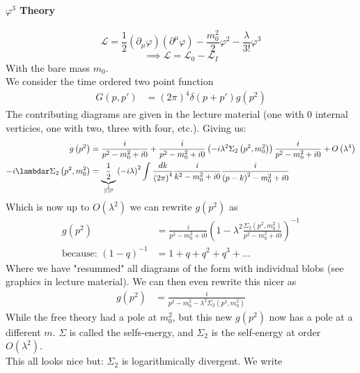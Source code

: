 \documentclass{report}
\begin{document}
\paragraph{$\varphi^3$ Theory} \[
\mathcal{L} = \frac{1}{2} \left( \partial_\mu \varphi  \right) \left( \partial^{\mu} \varphi  \right) - \frac{m_0^2}{2} \varphi^2 - \frac{\lambda}{3!} \varphi^3
\] \[
\implies \mathcal{L} = \mathcal{L}_0 - \mathcal{L}_I
\] With the bare mass $m_0$.\\
We consider the time ordered two point function
\begin{align*}
  G\left( p,p' \right) &= \left( 2\pi \right)^{4} \delta\left( p + p' \right) g\left( p^2 \right) 
\end{align*}
The contributing diagrams are given in the lecture material (one with 0 internal verticies, one with two, three with four, etc.). Giving us:
\begin{align*}
  g\left( p^2 \right) &= \frac{i}{p^2 - m_0^2 + i 0} + \frac{i}{p^2 - m_0^2 + i 0} \left( -i \lambda^2 \Sigma_2\left( p^2, m_0^2 \right)  \right) \frac{i}{p^2 - m_0^2 + i 0} + O\left( \lambda^{4}  \right)  \\
  -i \lambdar \Sigma_2\left( p^2, m_0^2 \right) &= \underbrace{\frac{1}{2} }_{\frac{1}{S S'} }  \left( -i \lambda \right)^2 \int_{}^{} \frac{dk}{\left( 2\pi \right) ^{4} } \frac{i}{k^2 - m_0^2 + i 0} \frac{i}{\left( p-k \right) ^2 - m_0^2 + i 0}   
\end{align*}
Which is now up to $O\left( \lambda^2 \right) $ we can rewrite $g\left( p^2 \right) $ as
\begin{align*}
  g\left( p^2 \right) &= \frac{i}{p^2 - m_0^2 + i 0} \left( 1 - \lambda^2 \frac{\Sigma_2\left( p^2, m_0^2 \right) }{p^2 - m_0^2 + i 0}  \right) ^{-1}  \\
  \text{because:  } \left( 1-q \right) ^{-1} &= 1 + q + q^2 + q^3 + \ldots 
\end{align*}
Where we have "resummed" all diagrams of the form with individual blobs (see graphics in lecture material). We can then even rewrite this nicer as
\begin{align*}
  g\left( p^2 \right) &= \frac{i}{p^2 - m_0^2 - \lambda^2 \Sigma_2\left( p^2, m_0^2 \right) } 
\end{align*}
While the free theory had a pole at $m_0^2$, but this new $g\left( p^2 \right) $ now has a pole at a different $m$. $\Sigma$ is called the selfs-energy, and $\Sigma_2$ is the self-energy at order $O\left( \lambda^2 \right) $. \\
This all looks nice but: $\Sigma_2$ is logarithmically divergent. We write
\end{document}
